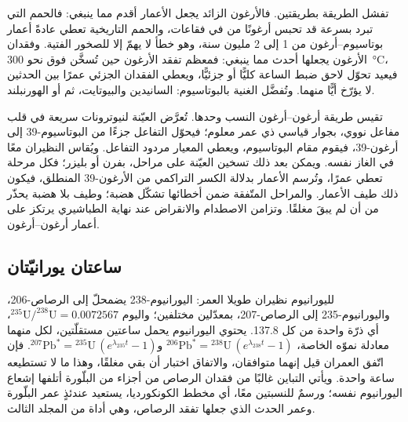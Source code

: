 تفشل الطريقة بطريقتين. فالأرغون الزائد يجعل الأعمار أقدم مما ينبغي: فالحمم التي تبرد بسرعة قد تحبس أرغونًا من  في فقاعات، والحمم التاريخية تعطي عادةً أعمار بوتاسيوم–أرغون من 1 إلى 2 مليون سنة، وهو خطأ لا يهمّ إلا للصخور الفتية. وفقدان الأرغون يجعلها أحدث مما ينبغي: فمعظم  تفقد الأرغون حين تُسخَّن فوق نحو \qty{300}{\celsius}، فيعيد تحوّل لاحق ضبط الساعة كليًّا أو جزئيًّا، ويعطي الفقدان الجزئي عمرًا بين الحدثين لا يؤرّخ أيًّا منهما. وتُفضَّل  الغنية بالبوتاسيوم: السانيدين والبيوتايت، ثم  أو الهورنبلند.

تقيس طريقة أرغون–أرغون النسب وحدها. تُعرَّض العيّنة لنيوترونات سريعة في قلب مفاعل نووي، بجوار  قياسي ذي عمر معلوم؛ فيحوّل التفاعل جزءًا من البوتاسيوم-39 إلى أرغون-39، فيقوم مقام البوتاسيوم، ويعطي المعيار مردود التفاعل. ويُقاس النظيران معًا في الغاز نفسه. ويمكن بعد ذلك تسخين العيّنة على مراحل، بفرن أو بليزر؛ فكل مرحلة تعطي عمرًا، وتُرسم الأعمار بدلالة الكسر التراكمي من الأرغون-39 المنطلق، فيكون ذلك طيف الأعمار. والمراحل المتّفقة ضمن أخطائها تشكّل هضبة؛ وطيف بلا هضبة يحذّر من أن  لم يبقَ مغلقًا. وتزامن الاصطدام والانقراض عند نهاية الطباشيري يرتكز على أعمار أرغون–أرغون.

\subsection*{ساعتان يورانيّتان}

لليورانيوم نظيران طويلا العمر: اليورانيوم-238 يضمحلّ إلى الرصاص-206، واليورانيوم-235 إلى الرصاص-207، بمعدّلين مختلفين؛ واليوم $^{235}\mathrm{U}/^{238}\mathrm{U} = 0.0072567$، أي ذرّة واحدة من كل 137.8.  يحتوي اليورانيوم يحمل ساعتين مستقلّتين، لكل منهما معادلة نموّه الخاصة، ${}^{206}\mathrm{Pb}^* = {}^{238}\mathrm{U}\,(e^{\lambda_{238} t} - 1)$ و${}^{207}\mathrm{Pb}^* = {}^{235}\mathrm{U}\,(e^{\lambda_{235} t} - 1)$. فإن اتّفق العمران قيل إنهما متوافقان، والاتفاق اختبار أن  بقي مغلقًا، وهذا ما لا تستطيعه ساعة واحدة. ويأتي التباين غالبًا من فقدان الرصاص من أجزاء من البلّورة أتلفها إشعاع اليورانيوم نفسه؛ ورسمٌ للنسبتين معًا، أي مخطط الكونكورديا، يستعيد عندئذٍ عمر البلّورة وعمر الحدث الذي جعلها تفقد الرصاص، وهي أداة من المجلد الثالث.

